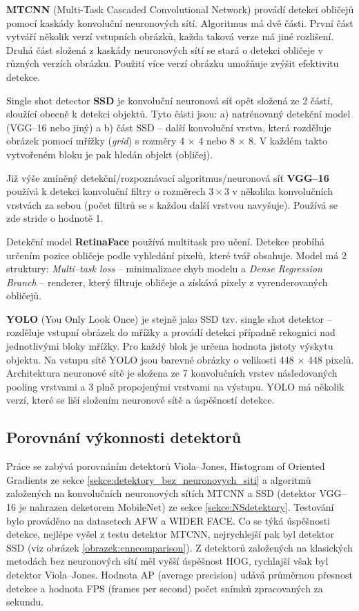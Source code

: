\textbf{MTCNN} (Multi-Task Cascaded Convolutional Network) \cite{fdCNNComparison, MTCNN} provádí detekci obličejů pomocí kaskády konvoluční neuronových sítí. Algoritmus má dvě části. První část vytváří několik verzí vstupních obrázků, každa taková verze má jiné rozlišení. Druhá část složená z kaskády neuronových sítí se stará o detekci obličeje v různých verzích obrázku. Použití více verzí obrázku umožňuje zvýšit efektivitu detekce.

Single shot detector \textbf{SSD} \cite{ssd} je konvoluční neuronová síť opět složená ze 2 částí, sloužící obecně k detekci objektů. Tyto části jsou: a) natrénovaný detekční model (VGG--16 nebo jiný) a b) část SSD -- další konvoluční vrstva, která rozděluje obrázek pomocí mřížky (\emph{grid}) s rozměry 4 $\times$ 4 nebo 8 $\times$ 8. V každém takto vytvořeném bloku je pak hledán objekt (obličej).

Již výše zmíněný detekční/rozpoznávací algoritmus/neuronová síť \textbf{VGG--16} \cite{vgg-16} používá k detekci konvoluční filtry o rozměrech $3 \times 3$ v několika konvolučních vrstvách za sebou (počet filtrů se s každou další vrstvou navyšuje). Používá se zde stride o hodnotě 1.

Detekční model \textbf{RetinaFace} \cite{lowLightFdReview} používá multitask pro učení. Detekce probíhá určením pozice obličeje podle vyhledání pixelů, které tvář obsahuje. Model má 2 struktury: \emph{Multi--task loss} -- minimalizace chyb modelu a \emph{Dense Regression Branch} -- renderer, který filtruje obličeje a získává pixely z vyrenderovaných obličejů.

\textbf{YOLO} (You Only Look Once) \cite{yolo} je stejně jako SSD tzv. single shot detektor -- rozděluje vstupní obrázek do mřížky a provádí detekci případně rekognici nad jednotlivými bloky mřížky. Pro každý blok je určena hodnota jistoty výskytu objektu. Na vstupu sítě YOLO jsou barevné obrázky o velikosti 448 $\times$ 448 pixelů. Architektura neuronové sítě je složena ze 7 konvolučních vrstev následovaných pooling vrstvami a 3 plně propojenými vrstvami na výstupu.
YOLO má několik verzí, které se liší složením neuronové sítě a úspěšností detekce.

\subsection*{Porovnání výkonnosti detektorů}
Práce \cite{fdCNNComparison} se zabývá porovnáním detektorů Viola--Jones, Histogram of Oriented Gradients ze sekce \ref{sekce:detektory_bez_neuronovych_siti} a algoritmů založených na konvolučních neuronových sítích MTCNN a SSD (detektor VGG--16 je nahrazen deketorem MobileNet) ze sekce \ref{sekce:NSdetektory}. Testování bylo prováděno na datasetech AFW a WIDER FACE. Co se týká úspěšnosti detekce, nejlépe vyšel z testu detektor MTCNN, nejrychlejší pak byl detektor SSD (viz obrázek \ref{obrazek:cnncomparison}). Z detektorů založených na klasických metodách bez neuronových sítí měl vyšší úspěšnost HOG, rychlajší však byl detektor Viola--Jones. Hodnota AP (average precision) udává průměrnou přesnost detekce a hodnota FPS (frames per second) počet snímků zpracovaných za sekundu.

